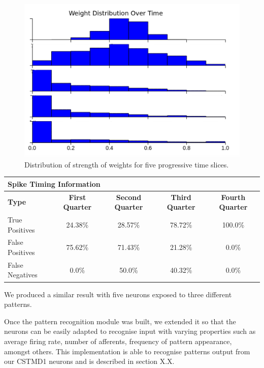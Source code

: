 \documentclass[a4paper,11pt]{article}
\begin{document}
\begin{figure}[H]
\centering
\includegraphics[scale = 0.35]{pr2}
\caption{Distribution of strength of weights for five progressive time slices.}
\end{figure}




\begin{table}[H]
\centering
\begin{tabular}{lllll}
\multicolumn{4}{l}{\textbf{Spike Timing Information}}\\
\hline
\multicolumn{1}{l}{\textbf{Type}} & \multicolumn{1}{c}{\textbf{First Quarter}} & \multicolumn{1}{c}{\textbf{Second Quarter}} & \multicolumn{1}{c}{\textbf{Third Quarter}} & \multicolumn{1}{c}{\textbf{Fourth Quarter}} \\ \hline
\multicolumn{1}{l}{True Positives} & \multicolumn{1}{c}{24.38\%} & \multicolumn{1}{c}{28.57\%} & \multicolumn{1}{c}{78.72\%} & \multicolumn{1}{c}{100.0\%} \\ \hline
\multicolumn{1}{l}{False Positives} & \multicolumn{1}{c}{75.62\%} & \multicolumn{1}{c}{71.43\%} & \multicolumn{1}{c}{21.28\%} & \multicolumn{1}{c}{0.0\%} \\ \hline
\multicolumn{1}{l}{False Negatives} & \multicolumn{1}{c}{0.0\%} & \multicolumn{1}{c}{50.0\%} & \multicolumn{1}{c}{40.32\%} & \multicolumn{1}{c}{0.0\%} \\ \hline
\end{tabular}
\end{table}


We produced a similar result with five neurons exposed to three different patterns.

	Once the pattern recognition module was built, we extended it so that the neurons can be easily adapted to recognise input with varying properties such as average firing rate, number of afferents, frequency of pattern appearance, amongst others. This implementation is able to recognise patterns output from our CSTMD1 neurons and is described in section X.X.
\end{document}
